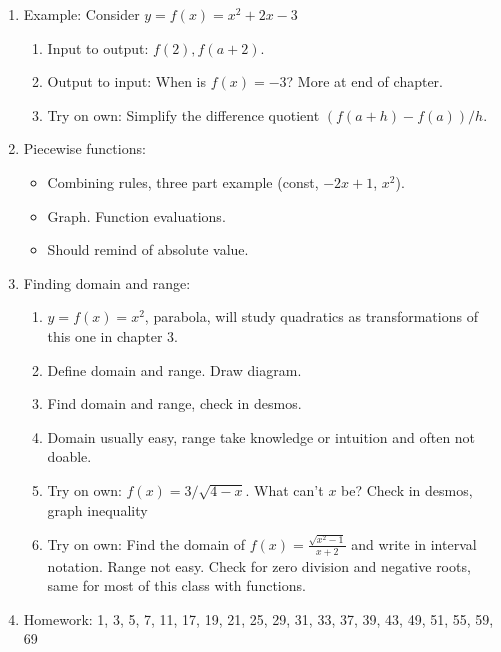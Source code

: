 \documentclass{article}
\begin{document}
\begin{enumerate}
\item Example: Consider $y=f(x)=x^2+2x-3$
\begin{enumerate}
\item Input to output: $f(2), f(a+2)$.
\item Output to input: When is $f(x)=-3$? More at end of chapter.
\item Try on own: Simplify the difference quotient $(f(a+h)-f(a))/h$.
\end{enumerate}

\item Piecewise functions:
\begin{itemize}
\item Combining rules, three part example (const, $-2x+1$, $x^2$).
\item Graph. Function evaluations.
\item Should remind of absolute value.
\end{itemize}

\item Finding domain and range:
\begin{enumerate}
\item $y = f(x) = x^2$, parabola, will study quadratics as transformations of this one in chapter 3.
\item Define domain and range. Draw diagram.
\item Find domain and range, check in desmos.
\item Domain usually easy, range take knowledge or intuition and often not doable.
\item Try on own: $f(x)=3/\sqrt{4-x}$. What can't $x$ be? Check in desmos, graph inequality
\item Try on own: Find the domain of $f(x) = \frac{\sqrt{x^2-1}}{x+2}$ and write in interval notation. Range not easy. Check for zero division and negative roots, same for most of this class with functions.
\end{enumerate}

\item Homework: 1, 3, 5, 7, 11, 17, 19, 21, 25, 29, 31, 33, 37, 39, 43, 49, 51, 55, 59, 69

\end{enumerate}

\end{document}
